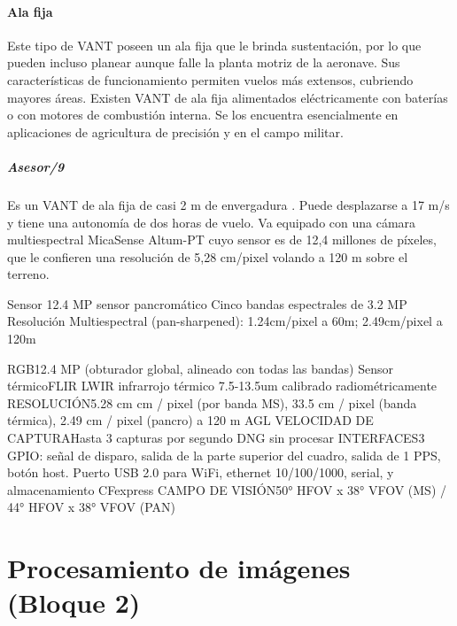 \paragraph{Ala fija}
Este tipo de VANT poseen un ala fija que le brinda sustentación, por lo que pueden incluso planear aunque falle la planta motriz de la aeronave. Sus características de funcionamiento permiten vuelos más extensos, cubriendo mayores áreas. Existen VANT de ala fija alimentados eléctricamente con baterías o con motores de combustión interna. Se los encuentra esencialmente en aplicaciones de agricultura de precisión y en el campo militar. 
\subparagraph{Asesor/9}
Es un VANT de ala fija de casi 2 m de envergadura \cite{noauthor_drone_nodate}. Puede desplazarse a 17 m/s y tiene una autonomía de dos horas de vuelo. Va equipado con una cámara multiespectral MicaSense Altum-PT \cite{noauthor_altum-pt_2023} cuyo sensor es de 12,4 millones de píxeles, que le confieren una resolución de 5,28 cm/pixel volando a 120 m sobre el terreno.

Sensor
12.4 MP sensor pancromático
Cinco bandas espectrales de 3.2 MP
Resolución
Multiespectral (pan-sharpened): 1.24cm/pixel a 60m; 2.49cm/pixel a 120m

RGB12.4 MP (obturador global, alineado con todas las bandas)
Sensor térmicoFLIR LWIR infrarrojo térmico 7.5-13.5um calibrado radiométricamente
RESOLUCIÓN5.28 cm cm / pixel (por banda MS), 33.5 cm / pixel (banda térmica), 2.49 cm / pixel (pancro) a 120 m AGL
VELOCIDAD DE CAPTURAHasta 3 capturas por segundo DNG sin procesar
INTERFACES3 GPIO: señal de disparo, salida de la parte superior del cuadro, salida de 1 PPS, botón host. Puerto USB 2.0 para WiFi, ethernet 10/100/1000, serial, y almacenamiento CFexpress
CAMPO DE VISIÓN50° HFOV x 38° VFOV (MS) / 44° HFOV x 38° VFOV (PAN)
\color{black}
\section{Procesamiento de imágenes (Bloque 2)}


